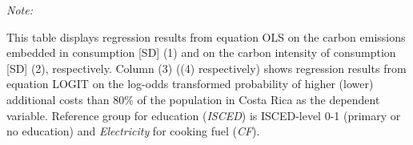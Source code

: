 \begin{table}[htbp!]
\begin{adjustbox}{width = 1\textwidth, max height = 0.95\textheight, center}
\begin{threeparttable}[b]
         \begin{tablenotes}\item \medskip \textit{Note:}
            \item This table displays regression results from equation OLS on the carbon emissions embedded in consumption [SD] (1) and on the carbon intensity of consumption [SD] (2), respectively. 
                                      Column (3) ((4) respectively) shows regression results from equation LOGIT on the log-odds transformed probability of higher (lower) additional costs than 80\% of the population in Costa Rica as the dependent variable. Reference group for education (\textit{ISCED}) is ISCED-level 0-1 (primary or no education) and \textit{Electricity} for cooking fuel (\textit{CF}).
         \end{tablenotes}
      \end{threeparttable}
   \end{adjustbox}
\end{table}



